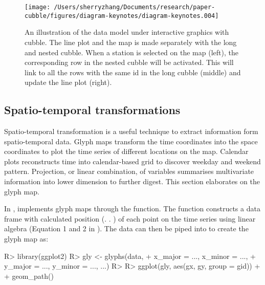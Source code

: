 \documentclass[
]{jss}
\begin{document}
\begin{CodeChunk}
\begin{figure}

{\centering \texttt{[image: /Users/sherryzhang/Documents/research/paper-cubble/figures/diagram-keynotes/diagram-keynotes.004]} 

}

\caption[An illustration of the data model under interactive graphics with cubble]{An illustration of the data model under interactive graphics with cubble. The line plot and the map is made separately with the long and nested cubble. When a station is selected on the map (left), the corresponding row in the nested cubble will be activated. This will link to all the rows with the same id in the long cubble (middle) and update the line plot (right).}\label{fig:illu-interactive}
\end{figure}
\end{CodeChunk}

\hypertarget{st_transformation}{%
\subsection{Spatio-temporal transformations}\label{st_transformation}}

Spatio-temporal transformation is a useful technique to extract information form spatio-temporal data. Glyph maps \citep{Wickham2012-yr} transform the time coordinates into the space coordinates to plot the time series of different locations on the map. Calendar plots \citep{wang2020calendar} reconstructs time into calendar-based grid to discover weekday and weekend pattern. Projection, or linear combination, of variables summarises multivariate information into lower dimension to further digest. This section elaborates on the glyph map.

In ,  implements glyph maps through the  function. The function constructs a data frame with calculated position (. . ) of each point on the time series using linear algebra (Equation 1 and 2 in \citet{Wickham2012-yr}). The data can then be piped into  to create the glyph map as:

\begin{CodeChunk}
\begin{CodeInput}
R> library(ggplot2)
R> gly <- glyphs(data, 
+               x_major = ..., x_minor = ..., 
+               y_major = ..., y_minor = ..., ...)
R> 
R> ggplot(gly, aes(gx, gy, group = gid)) + 
+   geom_path() 
\end{CodeInput}
\end{CodeChunk}
\end{document}
